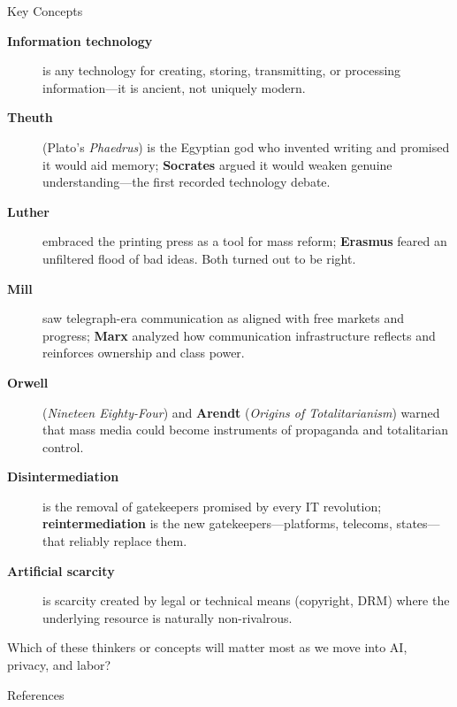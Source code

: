 \documentclass[aspectratio=169,11pt]{beamer}
\begin{document}
\begin{frame}[allowframebreaks]{Key Concepts}
\footnotesize
\begin{description}
    \item[\textbf{Information technology}] is any technology for creating, storing, transmitting, or processing information---it is ancient, not uniquely modern.
    \item[\textbf{Theuth}] (Plato's \textit{Phaedrus}) is the Egyptian god who invented writing and promised it would aid memory; \textbf{Socrates} argued it would weaken genuine understanding---the first recorded technology debate.
    \item[\textbf{Luther}] embraced the printing press as a tool for mass reform; \textbf{Erasmus} feared an unfiltered flood of bad ideas. Both turned out to be right.
    \item[\textbf{Mill}] saw telegraph-era communication as aligned with free markets and progress; \textbf{Marx} analyzed how communication infrastructure reflects and reinforces ownership and class power.
    \item[\textbf{Orwell}] (\textit{Nineteen Eighty-Four}) and \textbf{Arendt} (\textit{Origins of Totalitarianism}) warned that mass media could become instruments of propaganda and totalitarian control.
    \item[\textbf{Disintermediation}] is the removal of gatekeepers promised by every IT revolution; \textbf{reintermediation} is the new gatekeepers---platforms, telecoms, states---that reliably replace them.
    \item[\textbf{Artificial scarcity}] is scarcity created by legal or technical means (copyright, DRM) where the underlying resource is naturally non-rivalrous.
\end{description}

\begin{discussionbox}[Discussion]
Which of these thinkers or concepts will matter most as we move into AI, privacy, and labor?
\end{discussionbox}
\end{frame}

\begin{frame}[allowframebreaks]{References}
\printbibliography[heading=none]
\end{frame}
\end{document}
